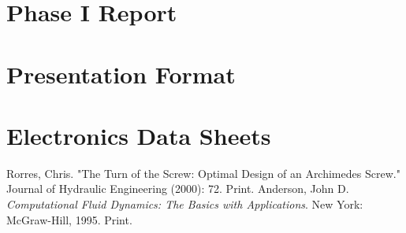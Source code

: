 \documentclass{report}
\begin{document}
\chapter{Phase I Report}
%
\chapter{Presentation Format}
\chapter{Electronics Data Sheets}
%
\begin{thebibliography}{9}
Rorres, Chris. "The Turn of the Screw: Optimal Design of an Archimedes Screw." Journal of Hydraulic Engineering (2000): 72. Print.
Anderson, John D. \textit{Computational Fluid Dynamics: The Basics with Applications}. New York: McGraw-Hill, 1995. Print.
\end{thebibliography}
\end{document}

